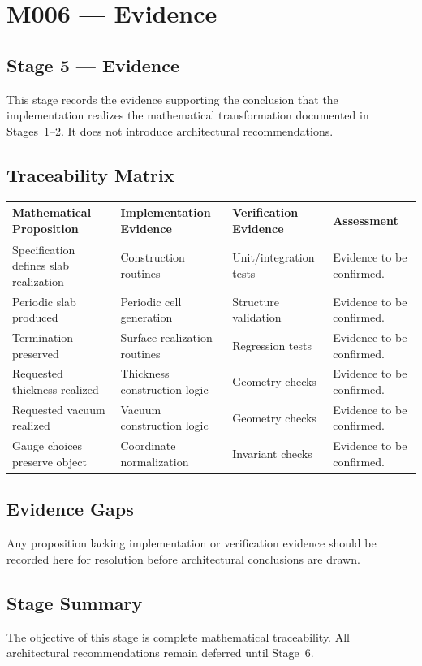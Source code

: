 \chapter{M006 --- Evidence}

\section{Stage 5 --- Evidence}

This stage records the evidence supporting the conclusion that the
implementation realizes the mathematical transformation documented in
Stages~1--2. It does not introduce architectural recommendations.

\section{Traceability Matrix}

\begin{tabular}{p{}p{}p{}p{}}
\textbf{Mathematical Proposition} &
\textbf{Implementation Evidence} &
\textbf{Verification Evidence} &
\textbf{Assessment}\\
\hline
Specification defines slab realization &
Construction routines &
Unit/integration tests &
Evidence to be confirmed.\\
Periodic slab produced &
Periodic cell generation &
Structure validation &
Evidence to be confirmed.\\
Termination preserved &
Surface realization routines &
Regression tests &
Evidence to be confirmed.\\
Requested thickness realized &
Thickness construction logic &
Geometry checks &
Evidence to be confirmed.\\
Requested vacuum realized &
Vacuum construction logic &
Geometry checks &
Evidence to be confirmed.\\
Gauge choices preserve object &
Coordinate normalization &
Invariant checks &
Evidence to be confirmed.\\
\end{tabular}

\section{Evidence Gaps}

Any proposition lacking implementation or verification evidence should be
recorded here for resolution before architectural conclusions are drawn.

\section{Stage Summary}

The objective of this stage is complete mathematical traceability. All
architectural recommendations remain deferred until Stage~6.
